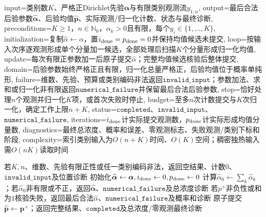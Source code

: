 \begin{AlgorithmContract}{
  input={类别数$K$、严格正Dirichlet先验$\boldsymbol\alpha$与有限类别观测流$y_{1:n}$},
  output={最后合法后验参数$\widehat{\boldsymbol\alpha}$、后验均值$\widehat{\boldsymbol p}$、实际观测/归一化计数、状态与最终诊断},
  preconditions={$K\ge1$，$n\in\mathbb N_0$，$\alpha_k>0$且有限，每个$y_i\in\{1,\ldots,K\}$},
  initialization={复制$\widehat\alpha\leftarrow\alpha$，置$i_{\rm done}=p_{\rm done}=0$并保持均值候选未提交},
  loop={按输入次序逐观测形成单个分量加一候选，全部处理后扫描$K$个分量形成归一化均值},
  update={每次有限正参数加一后原子提交$\widehat\alpha$；完整均值候选核验后整体提交},
  domain={后验参数始终严格正且有限，归一化总量严格正，后验均值位于概率单纯形},
  failure={维数、先验、预算或类别编码非法返回$\mathtt{invalid\_input}$；参数加法、求和或归一化非有限返回$\mathtt{numerical\_failure}$并保留最后合法后验参数},
  stop={恰好处理$n$个观测并归一化$K$项，或首次失败时停止},
  budget={至多$n$次计数提交与$K$次归一化，确定工作上限$n+K$},
  status={$\mathtt{completed}$、$\mathtt{invalid\_input}$、$\mathtt{numerical\_failure}$},
  iterations={$i_{\rm done}$计实际提交观测数，$p_{\rm done}$计实际形成均值分量数},
  diagnostics={最终总浓度、概率和误差、零观测标志、失败观测/类别下标和阶段},
  complexity={索引类别输入为$O(n+K)$时间、$O(K)$空间；稠密独热输入需$O(nK)$读取时间}
}
\begin{algorithm}[H]
\caption{狄利克雷--多项分布的顺序共轭更新}\label{alg:V1-C05-dirichlet}
若$K,n$、维数、先验有限正性或任一类别编码非法，返回空结果、计数$0$、$\mathtt{invalid\_input}$及位置诊断\;
初始化$\widehat{\boldsymbol\alpha}\leftarrow\boldsymbol\alpha,i_{\rm done}\leftarrow0,p_{\rm done}\leftarrow0$\;
计算$\widehat\alpha_0\leftarrow\sum_k\widehat\alpha_k$；若$\widehat\alpha_0$非有限或不正，返回$\widehat{\boldsymbol\alpha}$、$\mathtt{numerical\_failure}$及总浓度诊断\;
若$p^+$非负性或和为$1$核验失败，返回最后合法$\widehat\alpha$、$\mathtt{numerical\_failure}$及概率和诊断\;
原子提交$\widehat{\boldsymbol p}\leftarrow\boldsymbol p^+$；返回完整结果、$\mathtt{completed}$及总浓度/零观测最终诊断\;
\end{algorithm}
\end{AlgorithmContract}

